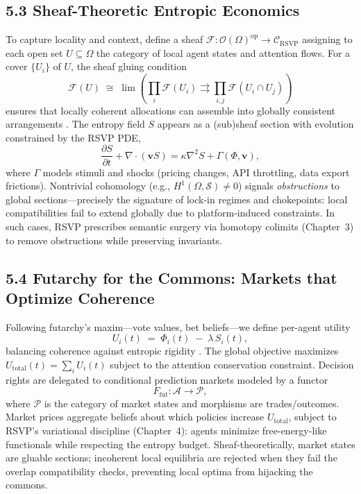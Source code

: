 \documentclass[12pt]{article}
\begin{document}
\subsection*{5.3 Sheaf-Theoretic Entropic Economics}
To capture locality and context, define a sheaf
\(\mathcal{F}:\mathcal{O}(\Omega)^{\mathrm{op}}\!\to\!\mathcal{C}_{\text{RSVP}}\)
assigning to each open set \(U\subseteq\Omega\) the category of local agent states and
attention flows. For a cover \(\{U_i\}\) of \(U\), the sheaf gluing condition
\[
\mathcal{F}(U) \;\cong\; \lim\!\left(
\prod_i \mathcal{F}(U_i) \rightrightarrows
\prod_{i,j} \mathcal{F}(U_i \cap U_j)
\right)
\]
ensures that locally coherent allocations can assemble into globally consistent
arrangements \citep{maclane1998, hatcher2002}. The entropy field \(S\) appears as a
(sub)sheaf section with evolution constrained by the RSVP PDE,
\[
\frac{\partial S}{\partial t} + \nabla\!\cdot(\mathbf{v}S)
= \kappa \nabla^2 S + \Gamma(\Phi,\mathbf{v}),
\]
where \(\Gamma\) models stimuli and shocks (pricing changes, API throttling, data
export frictions). Nontrivial cohomology (e.g., \(H^1(\Omega,\mathcal{S}) \neq 0\))
signals \emph{obstructions} to global sections—precisely the signature of
lock-in regimes and chokepoints: local compatibilities fail to extend globally due to
platform-induced constraints. In such cases, RSVP prescribes semantic surgery via
homotopy colimits (Chapter~3) to remove obstructions while preserving invariants.

\subsection*{5.4 Futarchy for the Commons: Markets that Optimize Coherence}
Following futarchy’s maxim—vote values, bet beliefs—we define per-agent utility
\[
U_i(t) \;=\; \Phi_i(t) \;-\; \lambda\, S_i(t),
\]
balancing coherence against entropic rigidity \citep{hanson2003}. The global objective
maximizes \(U_{\mathrm{total}}(t)=\sum_i U_i(t)\) subject to the attention conservation
constraint. Decision rights are delegated to conditional prediction markets modeled by a
functor
\[
F_{\mathrm{fut}}:\mathcal{A} \longrightarrow \mathcal{P},
\]
where \(\mathcal{P}\) is the category of market states and morphisms are trades/outcomes.
Market prices aggregate beliefs about which policies increase \(U_{\mathrm{total}}\),
subject to RSVP’s variational discipline (Chapter~4): agents minimize free-energy-like
functionals while respecting the entropy budget. Sheaf-theoretically, market states are
gluable sections; incoherent local equilibria are rejected when they fail the overlap
compatibility checks, preventing local optima from hijacking the commons.
\end{document}
